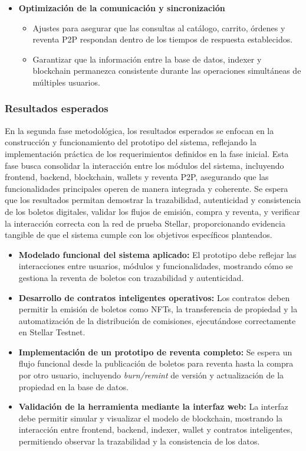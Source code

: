 \documentclass[12pt,a4paper]{article}
\begin{document}
\begin{itemize}
    \item \textbf{Optimización de la comunicación y sincronización}
    \begin{itemize}
        \item Ajustes para asegurar que las consultas al catálogo, carrito, órdenes
        y reventa P2P respondan dentro de los tiempos de respuesta establecidos.
        \item Garantizar que la información entre la base de datos, indexer y
        blockchain permanezca consistente durante las operaciones simultáneas de
        múltiples usuarios.
    \end{itemize}
\end{itemize}

\subsubsection{Resultados esperados}
En la segunda fase metodológica, los resultados esperados se enfocan en la construcción y funcionamiento del prototipo del sistema, reflejando la implementación práctica de los requerimientos definidos en la fase inicial. Esta fase busca consolidar la interacción entre los módulos del sistema, incluyendo frontend, backend, blockchain, wallets y reventa P2P, asegurando que las funcionalidades principales operen de manera integrada y coherente. Se espera que los resultados permitan demostrar la trazabilidad, autenticidad y consistencia de los boletos digitales, validar los flujos de emisión, compra y reventa, y verificar la interacción correcta con la red de prueba Stellar, proporcionando evidencia tangible de que el sistema cumple con los objetivos específicos planteados.

\begin{itemize}
    \item \textbf{Modelado funcional del sistema aplicado:}
    El prototipo debe reflejar las interacciones entre usuarios, módulos y
    funcionalidades, mostrando cómo se gestiona la reventa de boletos con
    trazabilidad y autenticidad.

    \item \textbf{Desarrollo de contratos inteligentes operativos:}
    Los contratos deben permitir la emisión de boletos como NFTs, la transferencia
    de propiedad y la automatización de la distribución de comisiones, ejecutándose
    correctamente en Stellar Testnet.

    \item \textbf{Implementación de un prototipo de reventa completo:}
    Se espera un flujo funcional desde la publicación de boletos para reventa hasta
    la compra por otro usuario, incluyendo \textit{burn/remint} de versión y
    actualización de la propiedad en la base de datos.

    \item \textbf{Validación de la herramienta mediante la interfaz web:}
    La interfaz debe permitir simular y visualizar el modelo de blockchain,
    mostrando la interacción entre frontend, backend, indexer, wallet y contratos
    inteligentes, permitiendo observar la trazabilidad y la consistencia de los
    datos.
\end{itemize}
\end{document}
